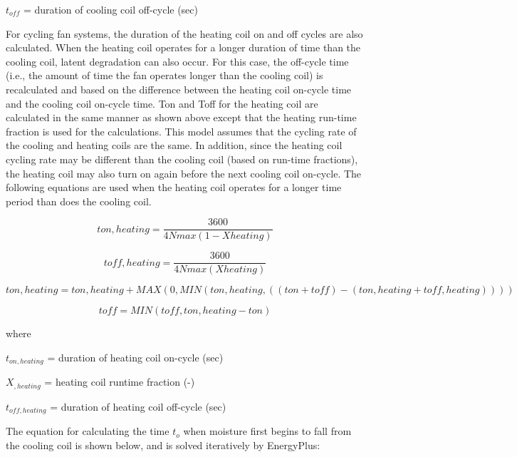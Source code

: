 \(t_{off}\) = duration of cooling coil off-cycle (sec)

For cycling fan systems, the duration of the heating coil on and off cycles are also calculated. When the heating coil operates for a longer duration of time than the cooling coil, latent degradation can also occur. For this case, the off-cycle time (i.e., the amount of time the fan operates longer than the cooling coil) is recalculated and based on the difference between the heating coil on-cycle time and the cooling coil on-cycle time. Ton and Toff for the heating coil are calculated in the same manner as shown above except that the heating run-time fraction is used for the calculations. This model assumes that the cycling rate of the cooling and heating coils are the same. In addition, since the heating coil cycling rate may be different than the cooling coil (based on run-time fractions), the heating coil may also turn on again before the next cooling coil on-cycle. The following equations are used when the heating coil operates for a longer time period than does the cooling coil.

\begin{equation}
ton,heating = \frac{{3600}}{{4Nmax\left( {1 - Xheating} \right)}}
\end{equation}

\begin{equation}
toff,heating = \frac{{3600}}{{4Nmax\left( {Xheating} \right)}}
\end{equation}

{\scriptsize
\begin{equation}
ton,heating = ton,heating + MAX\left( {0,MIN\left( {ton,heating,\left( {\left( {ton + toff} \right) - \left( {ton,heating + toff,heating} \right)} \right)} \right)} \right)
\end{equation}}

\begin{equation}
toff = MIN\left( {toff,ton,heating - ton} \right)
\end{equation}

where

\(t_{on,heating}\) = duration of heating coil on-cycle (sec)

\(X_{,heating}\) = heating coil runtime fraction (-)

\(t_{off,heating}\) = duration of heating coil off-cycle (sec)

The equation for calculating the time \(t_{o}\) when moisture first begins to fall from the cooling coil is shown below, and is solved iteratively by EnergyPlus:

